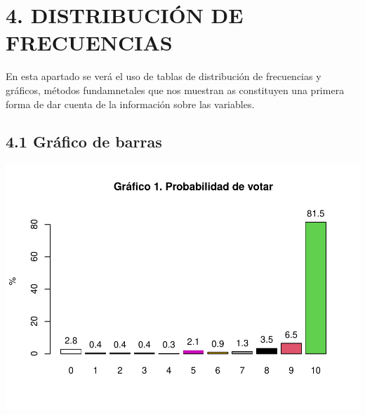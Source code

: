 \documentclass[
]{article}
\newenvironment{Shaded}{\begin{snugshade}}{\end{snugshade}}
\newcommand{\AttributeTok}[1]{\textcolor[rgb]{0.13,0.29,0.53}{#1}}
\newcommand{\ConstantTok}[1]{\textcolor[rgb]{0.56,0.35,0.01}{#1}}
\newcommand{\DecValTok}[1]{\textcolor[rgb]{0.00,0.00,0.81}{#1}}
\newcommand{\FunctionTok}[1]{\textcolor[rgb]{0.13,0.29,0.53}{\textbf{#1}}}
\newcommand{\NormalTok}[1]{#1}
\newcommand{\OtherTok}[1]{\textcolor[rgb]{0.56,0.35,0.01}{#1}}
\newcommand{\SpecialCharTok}[1]{\textcolor[rgb]{0.81,0.36,0.00}{\textbf{#1}}}
\newcommand{\StringTok}[1]{\textcolor[rgb]{0.31,0.60,0.02}{#1}}
\begin{document}
\hypertarget{distribuciuxf3n-de-frecuencias}{%
\section{4. DISTRIBUCIÓN DE
FRECUENCIAS}\label{distribuciuxf3n-de-frecuencias}}

En esta apartado se verá el uso de tablas de distribución de frecuencias
y gráficos, métodos fundamnetales que nos muestran as constituyen una
primera forma de dar cuenta de la información sobre las variables.

\hypertarget{gruxe1fico-de-barras}{%
\subsection{4.1 Gráfico de barras}\label{gruxe1fico-de-barras}}

\begin{Shaded}
\end{Shaded}

\includegraphics{probabilidadVoto_files/figure-latex/graficoBarras-1.pdf}
\end{document}
